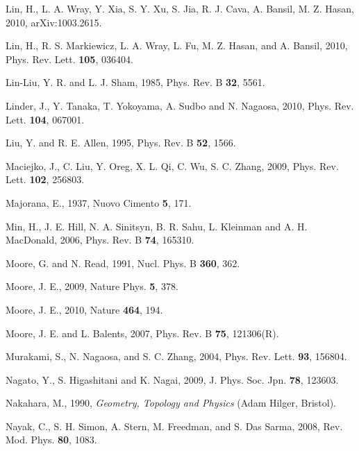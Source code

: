 \documentclass[twocolumn,floatfix,showpacs,rmp,aps]{revtex4}
\begin{document}
\begin{thebibliography}{99}
Lin, H., L. A. Wray, Y. Xia, S. Y. Xu, S. Jia, R. J. Cava, A. Bansil, M. Z. Hasan, 2010,
arXiv:1003.2615.

Lin, H., R. S. Markiewicz, L. A. Wray, L. Fu, M. Z. Hasan, and A. Bansil, 2010,
Phys. Rev. Lett. {\bf 105}, 036404.

Lin-Liu, Y. R. and L. J. Sham, 1985,
Phys. Rev. B {\bf 32}, 5561.

Linder, J., Y. Tanaka, T. Yokoyama, A. Sudbo and N. Nagaosa, 2010,
Phys. Rev. Lett. {\bf 104}, 067001.

Liu, Y. and R. E. Allen, 1995,
Phys. Rev. B {\bf 52}, 1566.

Maciejko, J., C. Liu, Y. Oreg, X. L. Qi, C. Wu, S. C. Zhang, 2009,
Phys. Rev. Lett. {\bf 102}, 256803.

Majorana, E., 1937,
Nuovo Cimento {\bf 5}, 171.

Min, H., J. E. Hill, N. A. Sinitsyn, B. R. Sahu, L. Kleinman and A. H.
MacDonald, 2006,
Phys. Rev. B {\bf 74}, 165310.

Moore, G. and N. Read, 1991,
Nucl. Phys. B {\bf 360}, 362.

Moore, J. E., 2009,
Nature Phys. {\bf 5}, 378.

Moore, J. E., 2010, Nature {\bf 464}, 194.

Moore, J. E. and L. Balents, 2007,
Phys. Rev. B {\bf 75}, 121306(R).

Murakami, S., N. Nagaosa, and S. C. Zhang, 2004,
Phys. Rev. Lett. {\bf 93}, 156804.

Nagato, Y., S. Higashitani and K. Nagai, 2009,
J. Phys. Soc. Jpn. {\bf 78}, 123603.

Nakahara, M., 1990,
{\it Geometry, Topology and Physics} (Adam Hilger, Bristol).

Nayak, C., S. H. Simon, A. Stern, M. Freedman, and S. Das Sarma, 2008,
Rev. Mod. Phys. {\bf 80}, 1083.


\end{thebibliography}
\end{document}
